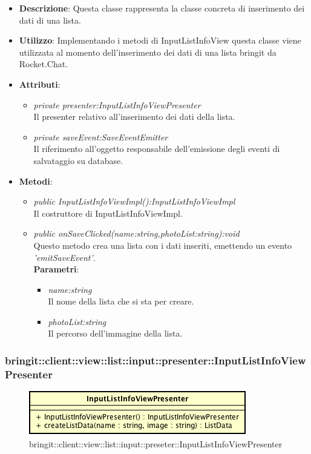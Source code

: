 \begin{itemize}
\item \textbf{Descrizione}: Questa classe rappresenta la classe concreta di inserimento dei dati di una lista.
\item \textbf{Utilizzo}: Implementando i metodi di InputListInfoView questa classe viene utilizzata al momento dell'inserimento dei dati di una lista bringit da Rocket.Chat.
\item \textbf{Attributi}: 
\begin{itemize}
	\item \textit{private presenter:InputListInfoViewPresenter}\\
	Il presenter relativo all'inserimento dei dati della lista.
	\item \textit{private saveEvent:SaveEventEmitter}\\
	Il riferimento all'oggetto responsabile dell'emissione degli eventi di salvataggio su database.
\end{itemize}
\item \textbf{Metodi}:
	\begin{itemize}
	\item \textit{public InputListInfoViewImpl():InputListInfoViewImpl}\\
	Il costruttore di InputListInfoViewImpl.
	\item \textit{public onSaveClicked(name:string,photoList:string):void}\\
	Questo metodo crea una lista con i dati inseriti, emettendo un evento \textit{'emitSaveEvent'}.
					\\ \textbf{Parametri}: \begin{itemize}
			\item \textit{name:string}\\
			Il nome della lista che si sta per creare.
			\item \textit{photoList:string}\\
			Il percorso dell'immagine della lista.
					\end{itemize} 
	\end{itemize}
\end{itemize} 

\subsubsection{bringit::client::view::list::input::presenter::InputListInfoViewPresenter}

\label{bringit::client::view::list::input::presenter::InputListInfoViewPresenter}
\begin{figure}[H]
	\centering
	\includegraphics[scale=0.5]{Sezioni/SottosezioniST/img/app/InputListInfoViewPresenter.png}
	\caption{bringit::client::view::list::input::preseter::InputListInfoViewPresenter}
\end{figure}

